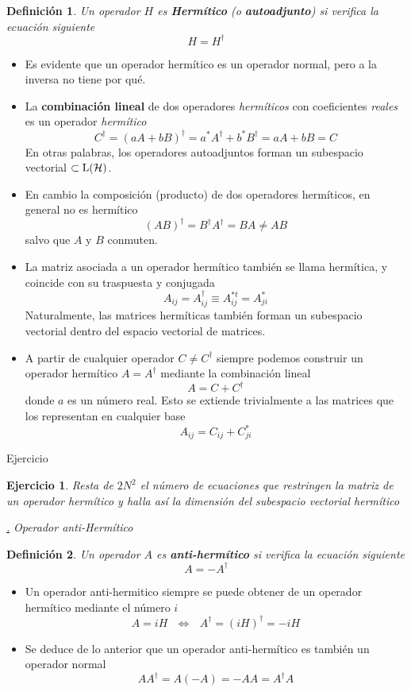\documentclass[a4paper,11pt]{book} %
\newtheorem{definicion_contador}{Definición}
\newcommand{\Definicion}[1]{
		\begin{mybox_gray2}{}
			\begin{definicion_contador}
				 #1 
			\end{definicion_contador} 
		\end{mybox_gray2}
	}
\newtheorem{ejercicio_contador}{Ejercicio}
\newcommand{\Ejercicio}[1]{
		\begin{mybox_gray}{Ejercicio} 
			\begin{ejercicio_contador}
				 #1 
			\end{ejercicio_contador} 
		\end{mybox_gray}
	}
\numberwithin{equation}{chapter}
\def\subsubiContadorIt{\par\addtocounter{subsubsection}{1}\underline{\it\thesubsubsection.}\hskip0.5cm \setcounter{subsubsubsectionIt}{0}}
\newcommand{\SubsubiIt}[1]{
		\subsubiContadorIt \textit{#1}
	}
\newcounter{subsubsubsectionIt}[subsubsection]
\begin{document}
\Definicion{
Un operador  $H$ es \textbf{Hermítico} (o \textbf{autoadjunto})  si  verifica la ecuación siguiente
	\begin{equation}
	H = H^\dagger
	\end{equation}
}
\begin{itemize}
	\item Es evidente que un operador hermítico es un operador normal, pero a la inversa no tiene por qué.
	\item La \textbf{combinación lineal} de dos operadores \textit{hermíticos} con coeficientes \textit{reales} es un operador \textit{hermítico}
$$
C^\dagger = (a A + b B)^\dagger = a^* A^\dagger + b^* B^\dagger = aA + b B = C
$$
En otras palabras, los operadores autoadjuntos forman un subespacio vectorial $\subset {\rm L}(\mathcal{H})$.

	\item En cambio la composición (producto) de dos operadores hermíticos, en general no es hermítico
	$$
	(A B)^\dagger = B^\dagger A^\dagger = BA \neq AB
	$$
	salvo que $A$ y $B$ conmuten.
	
	\item La matriz asociada a un operador hermítico también se llama hermítica, y coincide con su traspuesta y conjugada
$$
A_{ij} = A^\dagger_{ij} \equiv  A^{*t}_{ij} = A^*_{ji} 
$$
Naturalmente, las matrices hermíticas también forman un subespacio vectorial dentro del espacio vectorial de matrices. 
	\item A partir de cualquier operador $C\neq C^\dagger $ siempre podemos construir un operador hermítico $A=A^\dagger$ mediante la combinación lineal
$$
A = C + C^\dagger
$$
donde $a$ es un número real. Esto se extiende trivialmente a las matrices que los representan en cualquier base
$$
A_{ij} = C_{ij} + C_{ji}^*
$$ 
\end{itemize}

	\Ejercicio{
	Resta de $2N^2$ el número de ecuaciones que restringen la matriz de un operador hermítico y halla así la dimensión del \textit{subespacio vectorial hermítico}
	}
	

			\SubsubiIt{Operador anti-Hermítico}

\Definicion{
Un operador  $A$ es \textbf{anti-hermítico} si  verifica la ecuación siguiente
	\begin{equation}
	A = -A^\dagger
	\end{equation}
}
\begin{itemize}
	\item Un operador anti-hermitico siempre se puede obtener de un operador hermítico mediante el número $i$
	\begin{equation}
	A = i H ~~~\Longleftrightarrow ~~~A^\dagger = (i H)^\dagger = -i H
	\end{equation}
	\item Se deduce de lo anterior que un operador anti-hermítico es también un operador normal
	\begin{equation}
	A A^\dagger = A (-A) = -A A = A^\dagger A
	\end{equation}

\end{itemize}
\end{document}
